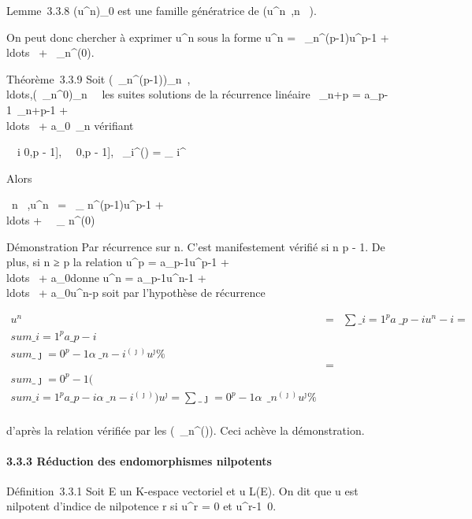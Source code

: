 \documentclass[]{article}
\begin{document}
Lemme~3.3.8 (u^n)\_0\leqn{} est une famille
génératrice de
\mathrmVect(u^n~,n
\in {}~).

On peut donc chercher à exprimer u^n sous la forme
u^n = \alpha~\_n^(p-1)u^p-1 +
\\ldots~ +
\alpha~\_n^(0)\mathrmId.

Théorème~3.3.9 Soit
(\alpha~\_n^(p-1))\_n\in{}~,\\ldots,(\alpha~\_n^0)\_n\in{}~~
les suites solutions de la récurrence linéaire \alpha~\_n+p =
a\_p-1\alpha~\_n+p-1 +
\\ldots~ +
a\_0\alpha~\_n vérifiant

\forall~~i \in {[}0,p - 1{]},
\forall~~\jmath \in {[}0,p - 1{]},\quad
\alpha~\_i^(\jmath) = \delta\_ i^\jmath

Alors

\forall~n \in {}~,\quad u^n~ =
\alpha~\_ n^(p-1)u^p-1 +
\\ldots + \alpha~~\_
n^(0)\mathrmId

Démonstration Par récurrence sur n. C'est manifestement vérifié si n \leq p
- 1. De plus, si n ≥ p la relation u^p =
a\_p-1u^p-1 +
\\ldots~ +
a\_0\mathrmId donne u^n =
a\_p-1u^n-1 +
\\ldots~ +
a\_0u^n-p soit par l'hypothèse de récurrence

\begin{align*} u^n& =&
\sum \_i=1^pa~\_
p-iu^n-i = \\sum
\_i=1^pa\_ p-i \\sum
\_\jmath=0^p-1\alpha~\_ n-i^(\jmath)u^\jmath \%&
\\ & =& \\sum
\_\jmath=0^p-1(\\sum
\_i=1^pa\_
p-i\alpha~\_n-i^(\jmath))u^\jmath =
\sum \_\jmath=0^p-1\alpha~~\_
n^(\jmath)u^\jmath\%& \\
\end{align*}

d'après la relation vérifiée par les (\alpha~\_n^(\jmath)). Ceci
achève la démonstration.

\paragraph{3.3.3 Réduction des endomorphismes nilpotents}

Définition~3.3.1 Soit E un K-espace vectoriel et u \in L(E). On dit que u
est nilpotent d'indice de nilpotence r si u^r = 0 et
u^r-1\neq~0.
\end{document}

